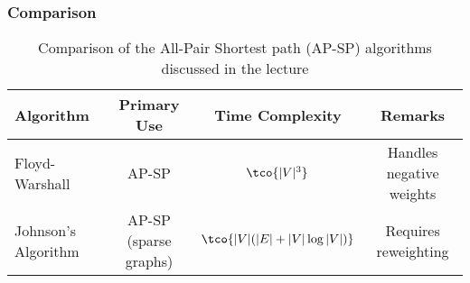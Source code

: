 \subsubsection{Comparison}
\begin{table}[h!]
    \centering
    \begin{tabular}{lccc}
        \toprule
        \textbf{Algorithm}  & \textbf{Primary Use}  & \textbf{Time Complexity}      & \textbf{Remarks}         \\
        \midrule
        Floyd-Warshall      & AP-SP                 & $\tco{|V|^3}$                   & Handles negative weights \\
        Johnson’s Algorithm & AP-SP (sparse graphs) & $\tco{|V|(|E| + |V| \log |V|)}$ & Requires reweighting     \\
        \bottomrule
    \end{tabular}
    \caption{Comparison of the All-Pair Shortest path (AP-SP) algorithms discussed in the lecture}
\end{table}
